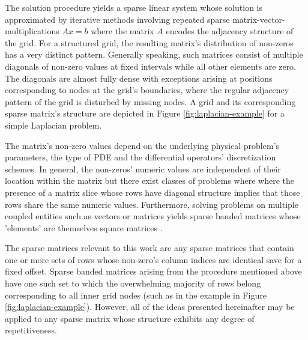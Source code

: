     The solution procedure yields a sparse linear system whose solution is approximated by iterative methods involving
    repeated sparse matrix-vector-multiplications $Ax = b$ where the matrix $A$ encodes the adjacency structure of the
    grid. For a structured grid, the resulting matrix's distribution of non-zeros has a very distinct pattern. Generally
    speaking, such matrices consist of multiple diagonals of non-zero values at fixed intervals while all other elements
    are zero. The diagonals are almost fully dense with exceptions arising at positions corresponding to nodes at the
    grid's boundaries, where the regular adjacency pattern of the grid is disturbed by missing nodes. A grid and its
    corresponding sparse matrix's structure are depicted in Figure \ref{fig:laplacian-example} for a simple Laplacian
    problem.

    The matrix's non-zero values depend on the underlying physical problem's parameters, the type of PDE and the
    differential operators' discretization schemes. In general, the non-zeros' numeric values are independent of their
    location within the matrix but there exist classes of problems where where the presence of a matrix slice whose rows
    have diagonal structure implies that those rows share the same numeric values. Furthermore, solving problems on
    multiple coupled entities such as vectors or matrices yields sparse banded matrices whose 'elements' are themselves
    square matrices \cite{Godwin2013}.

    The sparse matrices relevant to this work are any sparse matrices that contain one or more sets of rows whose
    non-zero's column indices are identical save for a fixed offset. Sparse banded matrices arising from the procedure
    mentioned above have one such set to which the overwhelming majority of rows belong corresponding to all inner grid
    nodes (such as in the example in Figure \ref{fig:laplacian-example}). However, all of the ideas presented
    hereinafter may be applied to any sparse matrix whose structure exhibits any degree of repetitiveness.
